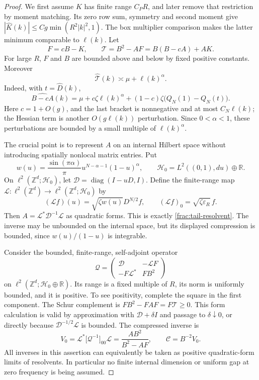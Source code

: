\documentclass[11pt]{article}
\begin{document}
\begin{proof}
We first assume \(K\) has finite range \(C_PR\), and later remove
that restriction by moment matching. Its zero row sum, symmetry and
second moment give \(|\widehat K(k)|\le Cg\min(R^2|k|^2,1)\).
The box multiplier comparison makes the latter minimum comparable
to \(\ell(k)\). Let
\[
 F=cB-K,\qquad \mathscr T=B^2-AF=B(B-cA)+AK.
\]
For large \(R\), \(F\) and \(B\) are bounded above and below by
fixed positive constants. Moreover
\begin{equation}\label{complete:den-comparison}
 \widehat{\mathscr T}(k)\asymp \mu+\ell(k)^\alpha.
\end{equation}
Indeed, with \(t=\widehat D(k)\),
\[
 \widehat{B-cA}(k)
 =\mu+c\zeta\ell(k)^\alpha
       +(1-c)\zeta\bigl(Q_N(1)-Q_N(t)\bigr).
\]
Here \(c=1+O(g)\), and the last bracket is nonnegative and at most
\(C_N\ell(k)\); the Hessian term is another \(O(g\ell(k))\)
perturbation. Since \(0<\alpha<1\), these perturbations are bounded
by a small multiple of \(\ell(k)^\alpha\).

The crucial point is to represent \(A\) on an internal Hilbert space
without introducing spatially nonlocal matrix entries. Put
\[
 w(u)=\frac{\sin(\pi\alpha)}\pi
                 u^{N-\alpha-1}(1-u)^\alpha,
 \qquad \mathcal H_0=L^2((0,1),du)\oplus\mathbb R.
\]
On \(\ell^2(\mathbb Z^d;\mathcal H_0)\), let
\(\mathscr D=\operatorname{diag}(I-uD,I)\). Define the finite-range
map \(\mathcal L:\ell^2(\mathbb Z^d)\to
\ell^2(\mathbb Z^d;\mathcal H_0)\) by
\[
 (\mathcal L f)(u)=\sqrt{\zeta w(u)}D^{N/2}f,
 \qquad (\mathcal L f)_0=\sqrt{\zeta\varepsilon_R}\,f.
\]
Then \(A=\mathcal L^*\mathscr D^{-1}\mathcal L\) as quadratic
forms. This is exactly \eqref{frac:tail-resolvent}. The inverse may
be unbounded on the internal space, but its displayed compression
is bounded, since \(w(u)/(1-u)\) is integrable.

Consider the bounded, finite-range, self-adjoint operator
\begin{equation}\label{complete:block-operator}
 \mathcal Q=
 \begin{pmatrix}
   \mathscr D&-\mathcal L F\\
   -F\mathcal L^*&FB^2
 \end{pmatrix}
\end{equation}
on \(\ell^2(\mathbb Z^d;\mathcal H_0\oplus\mathbb R)\).
Its range is a fixed multiple of \(R\), its norm is uniformly
bounded, and it is positive. To see positivity, complete the square
in the first component. The Schur complement is
\(FB^2-F A F=F\mathscr T\ge0\). This form calculation is valid
by approximation with \(\mathscr D+\delta I\) and passage to
\(\delta\downarrow0\), or directly because
\(\mathscr D^{-1/2}\mathcal L\) is bounded. The compressed inverse is
\begin{equation}\label{complete:block-compression}
 V_0=\mathcal L^*\bigl[\mathcal Q^{-1}\bigr]_{00}\mathcal L
       =\frac{AB^2}{B^2-AF},\qquad
 \mathscr C=B^{-2}V_0.
\end{equation}
All inverses in this assertion can equivalently be taken as positive
quadratic-form limits of resolvents. In particular no finite internal
dimension or uniform gap at zero frequency is being assumed.


\end{proof}
\end{document}
